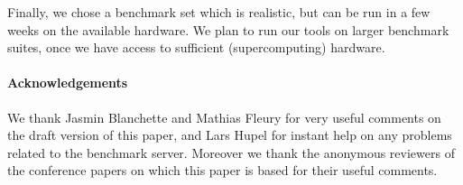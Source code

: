 \documentclass[smallcondensed]{svjour3}     %
\begin{document}
Finally, we chose a benchmark set which is realistic, but can be run in a few weeks on the available hardware.
We plan to run our tools on larger benchmark suites, once we have access to sufficient (supercomputing) hardware.

\paragraph{Acknowledgements} We thank Jasmin Blanchette and Mathias Fleury for very useful comments on the draft version of this paper, 
and Lars Hupel for instant help on any problems related to the benchmark server. Moreover we thank the anonymous reviewers of the 
conference papers on which this paper is based for their useful comments.




\end{document}
